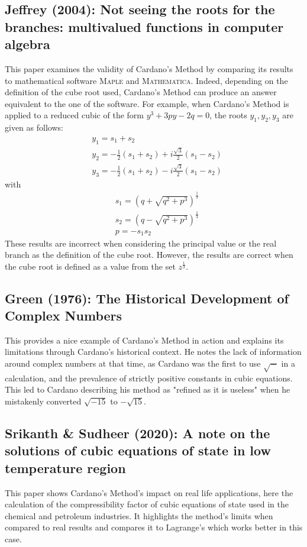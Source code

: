 \documentclass[12pt]{article}
\begin{document}
\subsection{Jeffrey (2004): Not seeing the roots for the branches: multivalued functions in computer algebra}
This paper examines the validity of Cardano's Method by comparing its results to mathematical software \textsc{Maple} and \textsc{Mathematica}. Indeed, depending on the definition of the cube root used, Cardano's Method can produce an answer equivalent to the one of the software. For example, when Cardano's Method is applied to a reduced cubic of the form $y^3 + 3py - 2q = 0$, the roots $y_1, y_2, y_3$ are given as follows:
\begin{align*}
    &y_1 = s_1 + s_2\\
    &y_2 = - \frac{1}{2} (s_1+s_2) + i \frac{\sqrt{3}}{2}(s_1-s_2)\\
    &y_3 = - \frac{1}{2} (s_1+s_2) - i \frac{\sqrt{3}}{2}(s_1-s_2)
\end{align*}
with
\begin{align*}
    &s_1 = (q+\sqrt{q^2 + p^3} )^\frac{1}{3}\\
    &s_2 = (q-\sqrt{q^2 + p^3} )^\frac{1}{3}\\
    &p = -s_1 s_2
\end{align*}
These results are incorrect when considering the principal value or the real branch as the definition of the cube root. However, the results are correct when the cube root is defined as a value from the set $z^\frac{1}{3}$.


\subsection{Green (1976): The Historical Development of Complex Numbers}
This provides a nice example of Cardano's Method in action and explains its limitations through Cardano's historical context. He notes the lack of information around complex numbers at that time, as Cardano was the first to use $\sqrt{-}$ in a calculation, and the prevalence of strictly positive constants in cubic equations. This led to Cardano describing his method as "refined as it is useless" when he mistakenly converted $\sqrt{-15}$ to $- \sqrt{15}$.

\subsection{Srikanth \& Sudheer (2020): A note on the solutions of cubic equations of state in low temperature region}
This paper shows Cardano's Method's impact on real life applications, here the calculation of the compressibility factor of cubic equations of state used in the chemical and petroleum industries. It highlights the method's limits when compared to real results and compares it to Lagrange's which works better in this case. 
\end{document}
